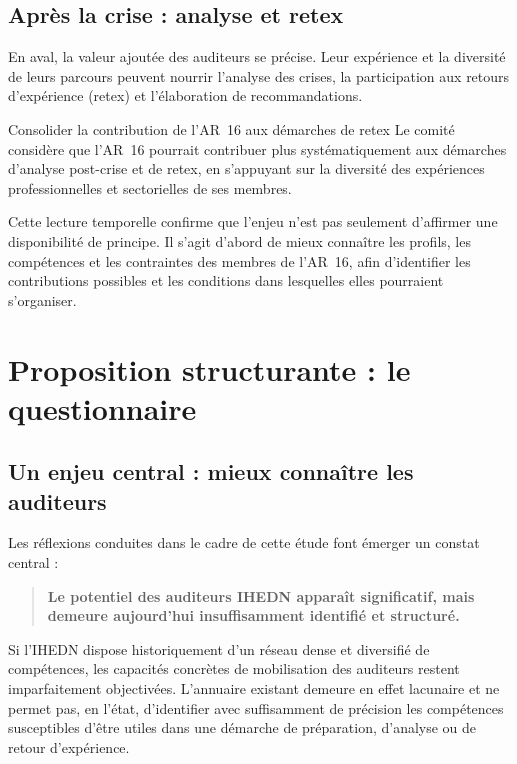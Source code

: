 \documentclass[12pt,a4paper]{article}
\newcommand{\ARSeize}{AR~16}
\begin{document}
\clearpage

\subsection{Après la crise : analyse et \texorpdfstring{\acrshort{retex}}{RETEX}}

En aval, la valeur ajoutée des auditeurs se précise. Leur expérience et la diversité de leurs parcours peuvent nourrir l'analyse des crises, la participation aux retours d'expérience (\acrshort{retex}) et l'élaboration de recommandations.

\begin{proposition}{Consolider la contribution de l'\ARSeize{} aux démarches de \texorpdfstring{\acrshort{retex}}{RETEX}}
Le comité considère que l'\ARSeize{} pourrait contribuer plus systématiquement aux démarches d'analyse post-crise et de \acrshort{retex}, en s'appuyant sur la diversité des expériences professionnelles et sectorielles de ses membres.
\end{proposition}

Cette lecture temporelle confirme que l'enjeu n'est pas seulement d'affirmer une disponibilité de principe. Il s'agit d'abord de mieux connaître les profils, les compétences et les contraintes des membres de l'\ARSeize, afin d'identifier les contributions possibles et les conditions dans lesquelles elles pourraient s'organiser.

\clearpage

\section{Proposition structurante : le questionnaire}

\subsection{Un enjeu central : mieux connaître les auditeurs}

Les réflexions conduites dans le cadre de cette étude font émerger un constat central :

\begin{quote}
\textbf{Le potentiel des auditeurs IHEDN apparaît significatif, mais demeure aujourd'hui insuffisamment identifié et structuré.}
\end{quote}

Si l'IHEDN dispose historiquement d'un réseau dense et diversifié de compétences, les capacités concrètes de mobilisation des auditeurs restent imparfaitement objectivées. L'annuaire existant demeure en effet lacunaire et ne permet pas, en l'état, d'identifier avec suffisamment de précision les compétences susceptibles d'être utiles dans une démarche de préparation, d'analyse ou de retour d'expérience.
\end{document}
